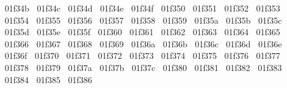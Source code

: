 {  ^^^^^^01f34b%
  ^^^^^^01f34c%
  ^^^^^^01f34d%
  ^^^^^^01f34e%
  ^^^^^^01f34f%
  ^^^^^^01f350%
  ^^^^^^01f351%
  ^^^^^^01f352%
  ^^^^^^01f353%
  ^^^^^^01f354%
  ^^^^^^01f355%
  ^^^^^^01f356%
  ^^^^^^01f357%
  ^^^^^^01f358%
  ^^^^^^01f359%
  ^^^^^^01f35a%
  ^^^^^^01f35b%
  ^^^^^^01f35c%
  ^^^^^^01f35d%
  ^^^^^^01f35e%
  ^^^^^^01f35f%
  ^^^^^^01f360%
  ^^^^^^01f361%
  ^^^^^^01f362%
  ^^^^^^01f363%
  ^^^^^^01f364%
  ^^^^^^01f365%
  ^^^^^^01f366%
  ^^^^^^01f367%
  ^^^^^^01f368%
  ^^^^^^01f369%
  ^^^^^^01f36a%
  ^^^^^^01f36b%
  ^^^^^^01f36c%
  ^^^^^^01f36d%
  ^^^^^^01f36e%
  ^^^^^^01f36f%
  ^^^^^^01f370%
  ^^^^^^01f371%
  ^^^^^^01f372%
  ^^^^^^01f373%
  ^^^^^^01f374%
  ^^^^^^01f375%
  ^^^^^^01f376%
  ^^^^^^01f377%
  ^^^^^^01f378%
  ^^^^^^01f379%
  ^^^^^^01f37a%
  ^^^^^^01f37b%
  ^^^^^^01f37c%
  ^^^^^^01f380%
  ^^^^^^01f381%
  ^^^^^^01f382%
  ^^^^^^01f383%
  ^^^^^^01f384%
  ^^^^^^01f385%
  ^^^^^^01f386%
}
